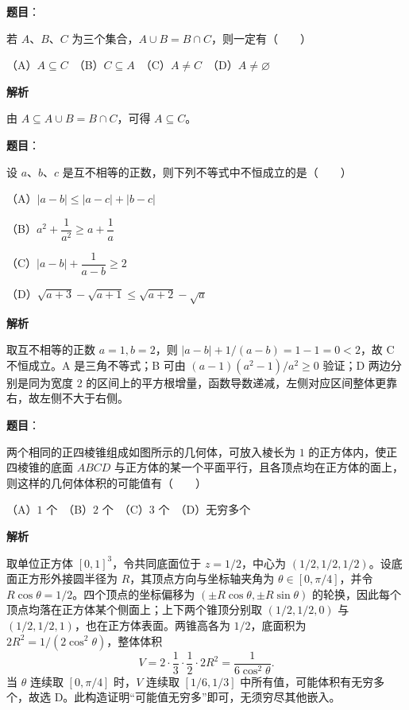\begin{answer}

\textbf{题目}：

若 $A\text{、}B\text{、}C$ 为三个集合，$A\cup B=B\cap C$，则一定有\mbox{（　　）}

（A）$A\subseteq C$　（B）$C\subseteq A$　（C）$A\ne C$　（D）$A\ne\varnothing$

\textbf{解析}

由 $A\subseteq A\cup B=B\cap C$，可得 $A\subseteq C$。


\end{answer}
\begin{answer}

\textbf{题目}：

设 $a\text{、}b\text{、}c$ 是互不相等的正数，则下列不等式中不恒成立的是\mbox{（　　）}

（A）$|a-b|\leqslant|a-c|+|b-c|$

（B）$a^2+\dfrac{1}{a^2}\geqslant a+\dfrac{1}{a}$

（C）$|a-b|+\dfrac{1}{a-b}\geqslant2$

（D）$\sqrt{a+3}-\sqrt{a+1}\leqslant\sqrt{a+2}-\sqrt a$

\textbf{解析}

取互不相等的正数 $a=1,b=2$，则 $|a-b|+1/(a-b)=1-1=0<2$，故 C 不恒成立。A 是三角不等式；B 可由 $(a-1)(a^2-1)/a^2\ge0$ 验证；D 两边分别是同为宽度 2 的区间上的平方根增量，函数导数递减，左侧对应区间整体更靠右，故左侧不大于右侧。


\end{answer}
\begin{answer}

\textbf{题目}：

两个相同的正四棱锥组成如图所示的几何体，可放入棱长为 $1$ 的正方体内，使正四棱锥的底面 $ABCD$ 与正方体的某一个平面平行，且各顶点均在正方体的面上，则这样的几何体体积的可能值有\mbox{（　　）}

（A）$1$ 个　（B）$2$ 个　（C）$3$ 个　（D）无穷多个
\nopagebreak[4]
\begin{center}\end{center}
\nopagebreak[4]
\textbf{解析}

取单位正方体 $[0,1]^3$，令共同底面位于 $z=1/2$，中心为 $(1/2,1/2,1/2)$。设底面正方形外接圆半径为 $R$，其顶点方向与坐标轴夹角为 $\theta\in[0,\pi/4]$，并令 $R\cos\theta=1/2$。四个顶点的坐标偏移为 $(\pm R\cos\theta,\pm R\sin\theta)$ 的轮换，因此每个顶点均落在正方体某个侧面上；上下两个锥顶分别取 $(1/2,1/2,0)$ 与 $(1/2,1/2,1)$，也在正方体表面。两锥高各为 $1/2$，底面积为 $2R^2=1/(2\cos^2\theta)$，整体体积
\nopagebreak[4]
\[V=2\cdot\frac13\cdot\frac12\cdot2R^2=\frac1{6\cos^2\theta}.\]
当 $\theta$ 连续取 $[0,\pi/4]$ 时，$V$ 连续取 $[1/6,1/3]$ 中所有值，可能体积有无穷多个，故选 D。此构造证明“可能值无穷多”即可，无须穷尽其他嵌入。


\end{answer}
